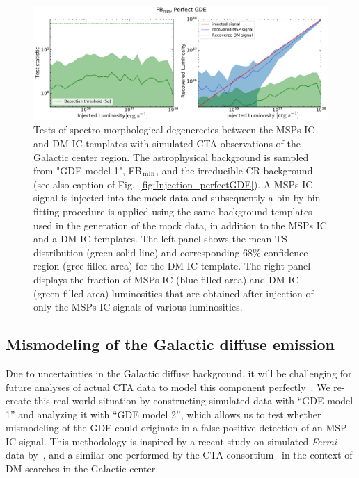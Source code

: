 \documentclass[doublespace,nopageskip]{VTthesis} %
\begin{document}
\begin{figure}[htb]
    \begin{center}
    \includegraphics[width=\textwidth]{Figures/CTA/TS-dm-mis-False-Fermi-min-True.pdf}
    \caption{Tests of spectro-morphological degenerecies between the MSPs IC and DM IC templates with simulated CTA observations of the Galactic center region. The astrophysical background is sampled from "GDE model 1", FB$_{\rm min}$, and the irreducible CR background (see also caption of Fig.~\ref{fig:Injection_perfectGDE}). A MSPs IC signal is injected into the mock data and subsequently a bin-by-bin fitting procedure is applied using the same background templates used in the generation of the mock data, in addition to the MSPs IC and a DM IC templates. The left panel shows the mean TS distribution (green solid line) and corresponding 68\% confidence region (gree filled area) for the DM IC template. The right panel displays the fraction of MSPs IC (blue filled area) and DM IC (green filled area) luminosities that are obtained after injection of only the MSPs IC signals of various luminosities. }
    \label{fig:MSPsvsDM_perfectGDE}
    \end{center}
\end{figure}

\subsection{Mismodeling of the Galactic diffuse emission}
\label{subsec:GDEmismodeling}

Due to uncertainties in the Galactic diffuse background, it will be challenging for future analyses of actual CTA data to model this component perfectly~\citep{2021JCAP...01..057A}. 
%
We re-create this  
real-world situation
by constructing simulated data with ``GDE model 1'' and analyzing it with ``GDE model 2'', which allows us to test whether mismodeling of the GDE could originate in a false positive detection of an MSP IC signal. This methodology is inspired by a recent study on simulated {\it Fermi} data by~\citep{2020PhRvD.101b3014C}, and a similar one performed by the CTA consortium~\citep{2021JCAP...01..057A} in the context of DM searches in the Galactic center. 
\end{document}
